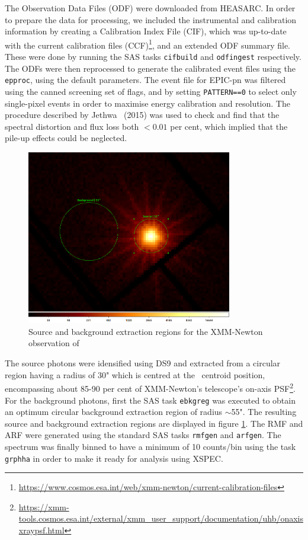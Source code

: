 	    	The Observation Data Files (ODF) were downloaded from HEASARC. In order to prepare the data for processing, we included the instrumental and calibration information by creating a Calibration Index File (CIF), which was up-to-date with the current calibration files (CCF)\footnote{\url{https://www.cosmos.esa.int/web/xmm-newton/current-calibration-files}}, and an extended ODF summary file. These were done by running the SAS tasks \texttt{cifbuild} and \texttt{odfingest} respectively. The ODFs were then reprocessed to generate the calibrated event files using the \texttt{epproc}, using the default parameters. The event file for EPIC-pn was filtered using the canned screening set of flags, and by setting \texttt{PATTERN==0} to select only single-pixel events in order to maximise energy calibration and resolution. The procedure described by Jethwa \etal\ (2015) \cite{jethwa2015pile} was used to check and find that the spectral distortion and flux loss both $<0.01$ per cent, which implied that the pile-up effects could be neglected.
	    	\begin{figure}[!htb]
		        \centering
		        \includegraphics[width=0.8\textwidth]{images/rx-j0925-7-4758_0111150101_src-bkg.png}
		        \caption{Source and background extraction regions for the XMM-Newton observation of \source}
		        \label{fig:src-bkg:pn}
		    \end{figure}
		    
		    The source photons were idensified using DS9 and extracted from a circular region having a radius of 30" which is centred at the \source\ centroid position, encompassing about 85-90 per cent of XMM-Newton's telescope's on-axis PSF\footnote{\url{https://xmm-tools.cosmos.esa.int/external/xmm_user_support/documentation/uhb/onaxisxraypsf.html}}. For the background photons, first the SAS task \texttt{ebkgreg} was executed to obtain an optimum circular background extraction region of radius $\sim$55". The resulting source and background extraction regions are displayed in figure \ref{fig:src-bkg:pn}. The RMF and ARF were generated using the standard SAS tasks \texttt{rmfgen} and \texttt{arfgen}. The spectrum was finally binned to have a minimum of 10 counts/bin using the task \texttt{grphha} in order to make it ready for analysis using XSPEC.
    	
